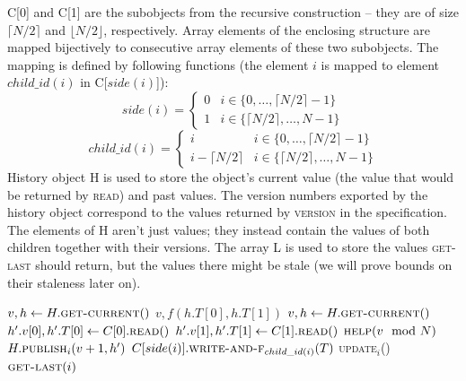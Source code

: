 \documentclass[a4paper,11pt]{article}
\newcommand{\fn}[1]{\textsc{#1}}
\begin{document}
C[0] and C[1] are the subobjects from the recursive construction -- they are of size $\lceil{}N/2\rceil{}$ and $\lfloor{}N/2\rfloor{}$, respectively. Array elements of the enclosing
structure are mapped bijectively to consecutive array elements of these two subobjects. The mapping is defined by following functions (the element $i$ is mapped to element $child\_id(i)$ in C[$side(i)$]):
\begin{equation*}
side(i) = \begin{cases} 0&i\in\{0,\ldots,\lceil{}N/2\rceil{}-1\}\\1&i\in\{\lceil{}N/2\rceil{},\ldots,N-1\}\end{cases}
\end{equation*}
\begin{equation*}
child\_id(i) = \begin{cases} i&i\in\{0,\ldots,\lceil{}N/2\rceil{}-1\}\\i-\lceil{}N/2\rceil{}&i\in\{\lceil{}N/2\rceil{},\ldots,N-1\}\end{cases}
\end{equation*}
History object H is used to store the object's current value (the value that would be returned by \fn{read}) and past values. The version numbers exported by the history object correspond to the values returned by \fn{version}
in the specification. The elements of H aren't just values; they instead contain the values of both children together with their versions.
The array L is used to store the values \fn{get-last} should return, but the values there might be stale (we will prove bounds on their staleness later on).

\begin{algorithmic}[1]
		\State $v, h \gets H.\fn{get-current}()$ \label{get-getownver}
		\State \Return $v, f(h.T[0], h.T[1])$
	\EndFunction
		\State $v, h \gets H.\fn{get-current}()$ \label{upd-getown}
		\State $h'.v[0], h'.T[0] \gets C[0].\fn{read}()$ \label{upd-getch-0}
		\State $h'.v[1], h'.T[1] \gets C[1].\fn{read}()$ \label{upd-getch-1}
		\State $\fn{help}(v \mod N)$
		\State \Return $H.\fn{publish$_i$}(v+1, h')$ \label{upd-publish}
	\EndFunction
		\State $C[side(i)].\fn{write-and-f$_{child\_id(i)}$}(T)$ \label{upd-chupd}
		\If{\textbf{not} \fn{update$_i$}()} \label{updcall1}
		\State \fn{update$_i$}() \label{updcall2}
		\EndIf
		\State \Return $\fn{get-last}(i)$
	\EndFunction
\end{algorithmic}
\end{document}
